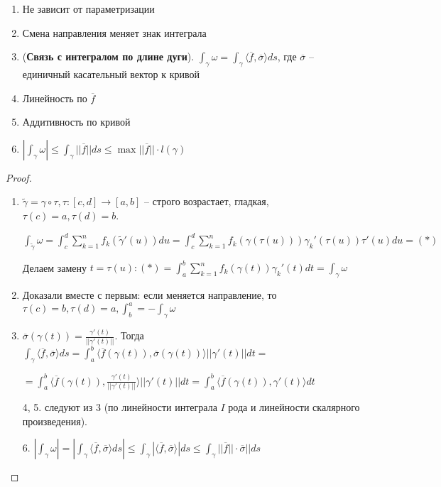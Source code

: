 \begin{properties}
    \begin{enumerate}
        \item Не зависит от параметризации
        \item Смена направления меняет знак интеграла
        \item (\textbf{Связь с интегралом по длине дуги}). $\int_{\gamma}^{}\omega = \int_{\gamma}^{}\langle \overline{f}, \overline{\sigma} \rangle ds$, где $\overline{\sigma}$ -- единичный касательный вектор к кривой
        \item Линейность по $\overline{f}$
        \item Аддитивность по кривой
        \item $|\int_{\gamma}^{}\omega| \leq \int_{\gamma}^{}||\overline{f}||ds \leq \max ||\overline{f}|| \cdot l(\gamma)$
    \end{enumerate}
\end{properties}

\begin{proof}
    \begin{enumerate}
        \item $\tilde{\gamma} = \gamma \circ \tau, \tau : [c, d] \to [a, b]$ -- строго возрастает, гладкая, $\tau(c) = a, \tau(d) = b$.

        $\int_{\tilde{\gamma}}^{}\omega = \int_{c}^{d}\sum_{k = 1}^{n}f_k(\tilde{\gamma}'(u))du = \int_{c}^{d}\sum_{k = 1}^{n}f_k(\gamma(\tau(u)))\gamma_k'(\tau(u))\tau'(u)du = (*)$

        Делаем замену $t = \tau(u): (*) = \int_{a}^{b}\sum_{k = 1}^{n}f_k(\gamma(t))\gamma_k'(t)dt = \int_{\gamma}^{}\omega$

        \item Доказали вместе с первым: если меняется направление, то $\tau(c) = b, \tau(d) = a, \int_{b}^{a} = -\int_{\gamma}^{}\omega$

        \item $\overline{\sigma}(\gamma(t)) = \frac{\gamma'(t)}{||\gamma'(t)||}$. Тогда $\int_{\gamma}^{}\langle \overline{f}, \overline{\sigma} \rangle ds = \int_{a}^{b}\langle \overline{f}(\gamma(t)), \overline{\sigma}(\gamma(t)) \rangle ||\gamma'(t)|| dt =$
        
        $= \int_{a}^{b} \langle \overline{f}(\gamma(t)), \frac{\gamma'(t)}{||\gamma'(t)||} \rangle||\gamma'(t)||dt = \int_{a}^{b} \langle \overline{f}(\gamma(t)), \gamma'(t) \rangle dt$
        \item[4, 5.] следуют из 3 (по линейности интеграла $I$ рода и линейности скалярного произведения).
        \item[6.] $|\int_{\gamma}^{}\omega| = |\int_{\gamma}^{} \langle \overline{f}, \overline{\sigma} \rangle ds| \leq \int_{\gamma}^{}|\langle \overline{f}, \overline{\sigma} \rangle| ds \leq \int_{\gamma}^{}||\overline{f}|| \cdot \overline{\sigma} || ds$
    \end{enumerate}
\end{proof}

